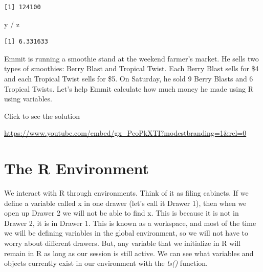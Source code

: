 \documentclass[
  letterpaper,
  DIV=11,
  numbers=noendperiod]{scrreprt}
\newenvironment{Shaded}{\begin{snugshade}}{\end{snugshade}}
\newcommand{\NormalTok}[1]{\textcolor[rgb]{0.00,0.23,0.31}{#1}}
\newcommand{\SpecialCharTok}[1]{\textcolor[rgb]{0.37,0.37,0.37}{#1}}
\begin{document}
\begin{verbatim}
[1] 124100
\end{verbatim}

\begin{Shaded}
\begin{Highlighting}[]
\NormalTok{y }\SpecialCharTok{/}\NormalTok{ z}
\end{Highlighting}
\end{Shaded}

\begin{verbatim}
[1] 6.331633
\end{verbatim}

\begin{tcolorbox}[enhanced jigsaw, colbacktitle=quarto-callout-tip-color!10!white, breakable, bottomrule=.15mm, colframe=quarto-callout-tip-color-frame, left=2mm, opacitybacktitle=0.6, title=\textcolor{quarto-callout-tip-color}{\faLightbulb}\hspace{0.5em}{Try it Out}, leftrule=.75mm, opacityback=0, rightrule=.15mm, titlerule=0mm, bottomtitle=1mm, colback=white, toprule=.15mm, arc=.35mm, toptitle=1mm, coltitle=black]

Emmit is running a smoothie stand at the weekend farmer's market. He
sells two types of smoothies: Berry Blast and Tropical Twist. Each Berry
Blast sells for \$4 and each Tropical Twist sells for \$5. On Saturday,
he sold 9 Berry Blasts and 6 Tropical Twists. Let's help Emmit calculate
how much money he made using R using variables.

Click to see the solution

\url{https://www.youtube.com/embed/gx_PcoPkXTI?modestbranding=1&rel=0}

\end{tcolorbox}

\section{The R Environment}\label{the-r-environment}

We interact with R through environments. Think of it as filing cabinets.
If we define a variable called x in one drawer (let's call it Drawer 1),
then when we open up Drawer 2 we will not be able to find x. This is
because it is not in Drawer 2, it is in Drawer 1. This is known as a
workspace, and most of the time we will be defining variables in the
global environment, so we will not have to worry about different
drawers. But, any variable that we initialize in R will remain in R as
long as our session is still active. We can see what variables and
objects currently exist in our environment with the \emph{ls()}
function.
\end{document}

